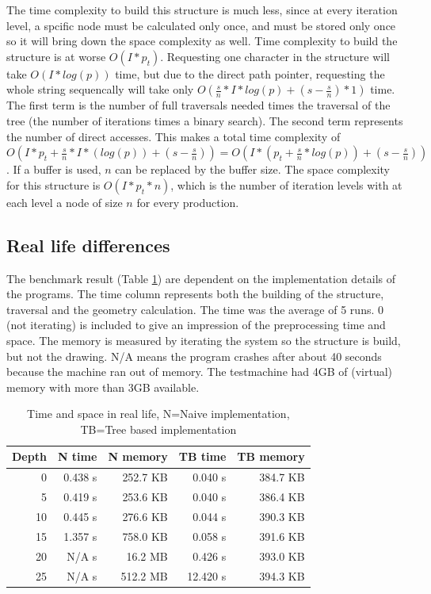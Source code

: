 \documentclass[11pt,a4paper]{article}
\begin{document}
The time complexity to build this structure is much less, since at every iteration level, a spcific node must be calculated only once, and must be stored only once so it will bring down the space complexity as well.
Time complexity to build the structure is at worse $O(I*p_t)$.
Requesting one character in the structure will take $O(I*log(p))$ time, but due to the direct path pointer, requesting the whole string sequencally will take only $O(\frac{s}{n} * I*log(p) + (s-\frac{s}{n}) * 1)$ time. The first term is the number of full traversals needed times the traversal of the tree (the number of iterations times a binary search). The second term represents the number of direct accesses. This makes a total time complexity of $O(I*p_t + \frac{s}{n} * I*(log(p)) + (s-\frac{s}{n})) = O(I * (p_t + \frac{s}{n} * log(p)) + (s - \frac{s}{n}))$. If a buffer is used, $n$ can be replaced by the buffer size.
The space complexity for this structure is $O(I*p_t*n)$, which is the number of iteration levels with at each level a node of size $n$ for every production.

\subsection{Real life differences} %

The benchmark result (Table \ref{bench}) are dependent on the implementation details of the programs. The time column represents both the building of the structure, traversal and the geometry calculation. The time was the average of 5 runs. 0 (not iterating) is included to give an impression of the preprocessing time and space. The memory is measured by iterating the system so the structure is build, but not the drawing. N/A means the program crashes after about 40 seconds because the machine ran out of memory. The testmachine had 4GB of (virtual) memory with more than 3GB available.

\begin{table}
\center
\begin{tabular}{r r r r r}
Depth & N time & N memory & TB time & TB memory \\ \hline
0  & 0.438 s & 252.7 KB &  0.040 s & 384.7 KB \\ \hline
5  & 0.419 s & 253.6 KB &  0.040 s & 386.4 KB \\ \hline
10 & 0.445 s & 276.6 KB &  0.044 s & 390.3 KB \\ \hline
15 & 1.357 s & 758.0 KB &  0.058 s & 391.6 KB \\ \hline
20 &   N/A s &  16.2 MB &  0.426 s & 393.0 KB \\ \hline
25 &   N/A s & 512.2 MB & 12.420 s & 394.3 KB \\
\end{tabular}
\caption{Time and space in real life, N=Naive implementation, TB=Tree based implementation} \label{bench}
\end{table}
\end{document}
